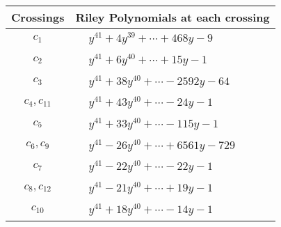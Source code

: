 \documentclass[1p]{elsarticle_modified}
\theoremstyle{definition}
\begin{document}
\begin{tabular}{m{50pt}|m{274pt}}
Crossings & \hspace{64pt}Riley Polynomials at each crossing \\
\hline $$\begin{aligned}c_{1}\end{aligned}$$&$\begin{aligned}
&y^{41}+4 y^{39}+\cdots+468 y-9
\end{aligned}$\\
\hline $$\begin{aligned}c_{2}\end{aligned}$$&$\begin{aligned}
&y^{41}+6 y^{40}+\cdots+15 y-1
\end{aligned}$\\
\hline $$\begin{aligned}c_{3}\end{aligned}$$&$\begin{aligned}
&y^{41}+38 y^{40}+\cdots-2592 y-64
\end{aligned}$\\
\hline $$\begin{aligned}c_{4},c_{11}\end{aligned}$$&$\begin{aligned}
&y^{41}+43 y^{40}+\cdots-24 y-1
\end{aligned}$\\
\hline $$\begin{aligned}c_{5}\end{aligned}$$&$\begin{aligned}
&y^{41}+33 y^{40}+\cdots-115 y-1
\end{aligned}$\\
\hline $$\begin{aligned}c_{6},c_{9}\end{aligned}$$&$\begin{aligned}
&y^{41}-26 y^{40}+\cdots+6561 y-729
\end{aligned}$\\
\hline $$\begin{aligned}c_{7}\end{aligned}$$&$\begin{aligned}
&y^{41}-22 y^{40}+\cdots-22 y-1
\end{aligned}$\\
\hline $$\begin{aligned}c_{8},c_{12}\end{aligned}$$&$\begin{aligned}
&y^{41}-21 y^{40}+\cdots+19 y-1
\end{aligned}$\\
\hline $$\begin{aligned}c_{10}\end{aligned}$$&$\begin{aligned}
&y^{41}+18 y^{40}+\cdots-14 y-1
\end{aligned}$\\
\hline
\end{tabular}\\~\\
\end{document}
